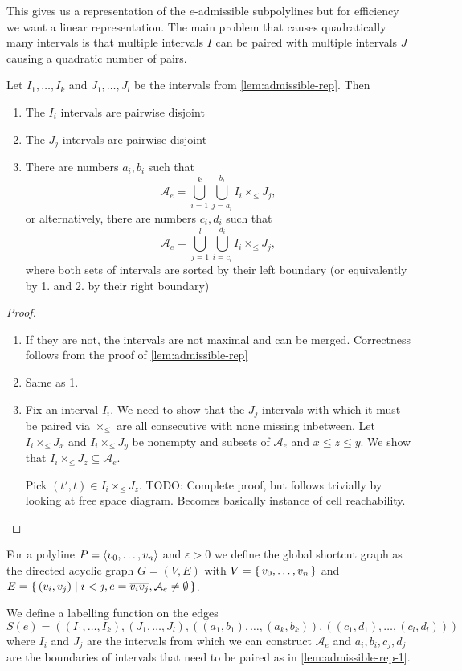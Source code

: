 This gives us a representation of the \(e\)-admissible subpolylines but for efficiency we want a linear representation. The main problem that causes quadratically many intervals is that multiple intervals \(I\) can be paired with multiple intervals \(J\) causing a quadratic number of pairs. 

\begin{lemma}\label{lem:admissible-rep-1}
	Let \(I_1, \dots, I_k\) and \(J_1, \dots, J_l\) be the intervals from \cref{lem:admissible-rep}. Then 
	\begin{enumerate}
		\item The \(I_i\) intervals are pairwise disjoint 
		\item The \(J_j\) intervals are pairwise disjoint 
		\item There are numbers \(a_i, b_i\) such that 
			\[\mathcal{A}_e = \bigcup_{i=1}^k \bigcup_{j=a_i}^{b_i} I_i \times_\leq J_j,\]	
			or alternatively, there are numbers \(c_i, d_i\) such that 
			\[\mathcal{A}_e = \bigcup_{j=1}^l \bigcup_{i=c_i}^{d_i} I_i \times_\leq J_j,\]	
		where both sets of intervals are sorted by their left boundary (or equivalently by 1. and 2. by their right boundary)
	\end{enumerate}
\end{lemma}

\begin{proof}
  \begin{enumerate}
		\item If they are not, the intervals are not maximal and can be merged. Correctness follows from the proof of \cref{lem:admissible-rep}
		\item Same as 1.
		\item Fix an interval \(I_i\). We need to show that the \(J_j\) intervals with which it must be paired via \(\times_\leq\) are all consecutive with none missing inbetween. Let \(I_i \times_\leq J_x\) and \(I_i \times_\leq J_y\) be nonempty and subsets of \(\mathcal{A}_e\) and \(x \leq z \leq y\). We show that \(I_i \times_\leq J_z \subseteq \mathcal{A}_e\).

			Pick \((t', t) \in I_i \times_\leq J_z\). TODO: Complete proof, but follows trivially by looking at free space diagram. Becomes basically instance of cell reachability.
  \end{enumerate}
\end{proof}

\begin{definition}
	For a polyline \(P = \left\langle v_0, \dots, v_n\right\rangle\) and \(\varepsilon > 0\) we define the global shortcut graph as the directed acyclic graph \(G = (V, E)\) with \(V = \set{v_0, \dots, v_n}\) and \(E = \set{(v_i, v_j) \mid i < j, e = \overline{v_iv_j}, \mathcal{A}_e \neq \emptyset}\).

	We define a labelling function on the edges 
	\[S(e) = ((I_1, \dots, I_k), (J_1, \dots, J_l), ((a_1, b_1), \dots, (a_k, b_k)), ((c_1, d_1), \dots, (c_l, d_l)))\] 
	where \(I_i\) and \(J_j\) are the intervals from which we can construct \(\mathcal{A}_e\) and \(a_i, b_i, c_j, d_j\) are the boundaries of intervals that need to be paired as in \cref{lem:admissible-rep-1}.
\end{definition}

